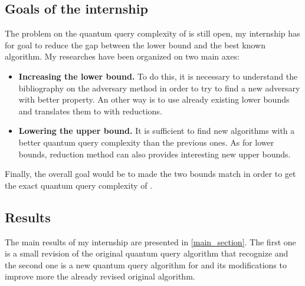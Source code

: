 \subsection{Goals of the internship}
The problem on the quantum query complexity of  is still open, my internship
has for goal to reduce the gap between the lower bound and the best known algorithm.
My researches have been organized on two main axes:
\begin{itemize}
    \item \textbf{Increasing the lower bound.} To do this, it is necessary to understand the bibliography
          on the adversary method in order to try to find a new adversary with better property. An other
          way is to use already existing lower bounds and translates them to  with reductions.
    \item \textbf{Lowering the upper bound.} It is sufficient to find new algorithms
          with a better quantum query complexity than the previous ones. As for lower bounds,
          reduction method can also provides interesting new upper bounds.
\end{itemize}
Finally, the overall goal would be to made the two bounds match in order to get the exact quantum
query complexity of .

\subsection{Results}

The main results of my internship are presented in \autoref{main_section}. The first
one is a small revision of the original quantum query algorithm that recognize
 \cite{art:2DGrid} and the second one is a new quantum query algorithm
for  and its modifications to improve more the already revised original
algorithm.
